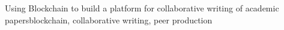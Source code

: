 \begin{englishabstract}{Using Blockchain to build a platform for collaborative writing of academic papers}{blockchain, collaborative writing, peer production}

\end{englishabstract}
